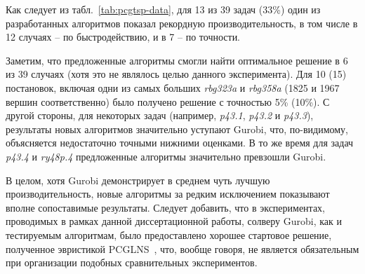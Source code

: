 Как следует из табл.~\ref{tab:pcgtsp-data},
для 13 из 39 задач (33\%)
один из разработанных алгоритмов показал рекордную производительность,
в том числе в 12 случаях – по быстродействию, и в 7 – по точности.

Заметим, что предложенные алгоритмы смогли найти оптимальное решение в 6 из 39 случаях
(хотя это не являлось целью данного эксперимента).
Для 10 (15) постановок, включая одни из самых больших \textit{rbg323a}
и \textit{rbg358a}
(1825 и 1967 вершин соответственно)
было получено решение с точностью 5\% (10\%).
С другой стороны, для некоторых задач
(например, \textit{p43.1}, \textit{p43.2} и \textit{p43.3}),
результаты новых алгоритмов значительно уступают Gurobi,
что, по-видимому, объясняется недостаточно точными нижними оценками.
В то же время для задач \textit{p43.4} и \textit{ry48p.4}
предложенные алгоритмы значительно превзошли Gurobi.

В целом, хотя Gurobi демонстрирует в среднем чуть лучшую производительность,
новые алгоритмы за редким исключением показывают вполне сопоставимые результаты.
Следует добавить,
что в экспериментах,
проводимых в рамках данной диссертационной работы,
солверу Gurobi, как и тестируемым алгоритмам,
было предоставлено хорошее стартовое решение,
полученное эвристикой PCGLNS~\cite{KKP-optima2020},
что, вообще говоря,
не является обязательным при организации подобных сравнительных экспериментов.
